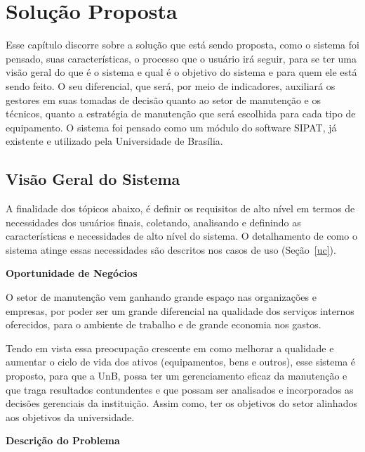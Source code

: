 \chapter{Solução Proposta}
\label{cap-solucao}

Esse capítulo discorre sobre a solução que está sendo proposta, como o sistema foi pensado, suas características, o processo que o usuário irá seguir, para se ter uma visão geral do que é o sistema e qual é o objetivo do sistema e para quem ele está sendo feito. 
O seu diferencial, que será, por meio de indicadores, auxiliará os gestores em suas tomadas de decisão quanto ao setor de manutenção e os técnicos, quanto a estratégia de manutenção que será escolhida para cada tipo de equipamento. O sistema foi pensado como um módulo do software SIPAT, já existente e utilizado pela Universidade de Brasília.


\section{Visão Geral do Sistema}

A finalidade dos tópicos abaixo, é definir os requisitos de alto nível em termos de necessidades dos usuários finais, coletando, analisando e definindo as características e necessidades de alto nível do sistema. O detalhamento de como o sistema atinge essas necessidades são descritos nos casos de uso (Seção~\ref{uc}).


\textbf{Oportunidade de Negócios}

O setor de manutenção vem ganhando grande espaço nas organizações e empresas, por poder ser um grande diferencial na qualidade dos serviços internos oferecidos, para o ambiente de trabalho e de grande economia nos gastos. 

Tendo em vista essa preocupação crescente em como melhorar a qualidade e aumentar o ciclo de vida dos ativos (equipamentos, bens e outros), esse sistema é proposto, para que a UnB, possa ter um gerenciamento eficaz da manutenção e que traga resultados contundentes e que possam ser analisados e incorporados as decisões gerenciais da instituição. Assim como, ter os objetivos do setor alinhados aos objetivos da universidade.

\pagebreak

\textbf{Descrição do Problema}

